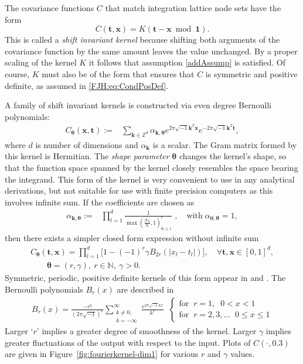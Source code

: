 \documentclass{iitthesis}          %
\newcommand{\bm}[1]{\boldsymbol{#1}}
\newcommand{\naturals}{\mathbb{N}}
\newcommand{\vtheta}{{\bm{\theta}}}
\newcommand{\vk}{\bm{k}}
\newcommand{\vt}{\bm{t}}
\newcommand{\vx}{\bm{x}}
\newcommand{\vone}{\bm{1}}
\newcommand\figref{Figure~\ref}
\begin{document}
\label{sec:shift_invar_kern}

The covariance functions $C$ that match integration lattice node sets have the form
\begin{equation} \label{eq:shInv}
C(\vt,\vx) = K(\vt - \vx \bmod \vone).
\end{equation}
This is called a \emph{shift invariant kernel} because shifting both arguments of the covariance function by the same amount leaves the value unchanged.   By a proper scaling of the kernel $K$ it follows that assumption \eqref{addAssump} is satisfied. Of course, $K$ must also be of the form that ensures that $C$ is symmetric and positive definite, as assumed in \eqref{FJH:eq:CondPosDef}. 

A family of shift invariant kernels is constructed via even degree Bernoulli polynomials:
\begin{align*}
C_\vtheta(\vx, \vt) := &  \sum_{\vk \in \mathbb{Z}^d} \alpha_{\vk,\vtheta}  e^{2 \pi\sqrt{-1} \vk^T\vx}
e^{-2 \pi\sqrt{-1} \vk^T\vt},
\end{align*}
where $d$ is number of dimensions and $\alpha_{\vk}$ is a scalar. The Gram matrix formed by this kernel is Hermitian. 
The \textit{shape parameter} $\vtheta$ changes the kernel's shape, so that the function space spanned by the kernel closely resembles the space bearing the integrand. 
This form of the kernel is very convenient to use in any analytical derivations, but not suitable for use with finite precision computers as this involves infinite sum. 
If the coefficients are chosen as 
\begin{align*}
\alpha_{\vk,\vtheta} := & \prod_{l=1}^d \frac{1}{\max(\frac{|k_l|}{\theta_l},1)^r_{\theta_l\leq 1}}  \;,  \quad \text{with} \; {\alpha}_{\bm{0},\vtheta} = 1,
\end{align*}
then there exists a simpler closed form expression without infinite sum
\begin{align}
\label{the_kernel_eqn_bernoulli}
C_\vtheta(\vt, \vx) =
\prod_{l=1}^d \biggl[
1 - (-1)^{r} \gamma B_{2r}( |{x_l-t_l}| ) \biggr], \quad  
\forall \vt,\vx \in [0,1]^d, \\ \qquad  \vtheta = (r,\gamma), \ r \in \naturals, \ \gamma > 0.
\end{align}
Symmetric, periodic, positive definite kernels of this form appear in  \cite{DicEtal14a} and \cite{Hic96a}.  The Bernoulli polynomials $B_{r}(x)$ are described in \cite[Chapter 24]{OlvEtal10a}
\begin{align*}
B_{r}(x) = \frac{-r!}{(2 \pi \sqrt{-1})^{r}} 
\sum_{\substack{k \neq 0,\\ k=-\infty}}^\infty 
\frac{e^{2\pi\sqrt{-1} k x}}{k^{r}}
\;\;
\begin{cases}
\text{for} \;\; r=1, \;\; 0 < x < 1 \\
\text{for} \;\; r=2,3,\hdots \;\; 0 \leq x \leq 1
\end{cases}
\end{align*}
Larger `$r$' implies a greater degree of smoothness of the kernel.  Larger $\gamma$ implies greater fluctuations of the output with respect to the input.  Plots of $C(\cdot, 0.3)$ are given in \figref{fig:fourierkernel-dim1} for various $r$ and $\gamma$ values.
\end{document}
